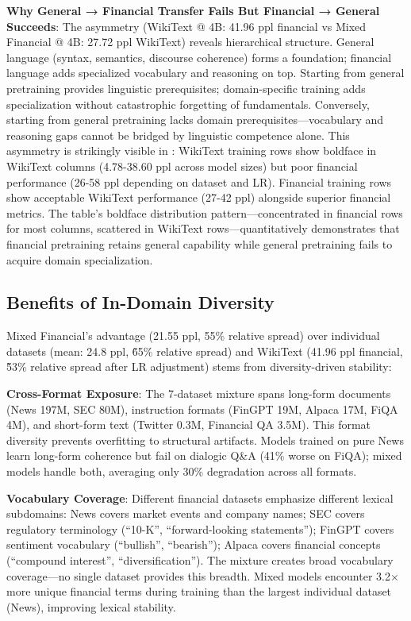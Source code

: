 \textbf{Why General → Financial Transfer Fails But Financial → General Succeeds}: The asymmetry (WikiText @ 4B: 41.96 ppl financial vs Mixed Financial @ 4B: 27.72 ppl WikiText) reveals hierarchical structure. General language (syntax, semantics, discourse coherence) forms a foundation; financial language adds specialized vocabulary and reasoning on top. Starting from general pretraining provides linguistic prerequisites; domain-specific training adds specialization without catastrophic forgetting of fundamentals. Conversely, starting from general pretraining lacks domain prerequisites—vocabulary and reasoning gaps cannot be bridged by linguistic competence alone. This asymmetry is strikingly visible in : WikiText training rows show boldface in WikiText columns (4.78-38.60 ppl across model sizes) but poor financial performance (26-58 ppl depending on dataset and LR). Financial training rows show acceptable WikiText performance (27-42 ppl) alongside superior financial metrics. The table's boldface distribution pattern—concentrated in financial rows for most columns, scattered in WikiText rows—quantitatively demonstrates that financial pretraining retains general capability while general pretraining fails to acquire domain specialization.

\subsection{Benefits of In-Domain Diversity}

Mixed Financial's advantage (21.55 ppl, 55\% relative spread) over individual datasets (mean: 24.8 ppl, \~65\% relative spread) and WikiText (41.96 ppl financial, \~53\% relative spread after LR adjustment) stems from diversity-driven stability:

\textbf{Cross-Format Exposure}: The 7-dataset mixture spans long-form documents (News 197M, SEC 80M), instruction formats (FinGPT 19M, Alpaca 17M, FiQA 4M), and short-form text (Twitter 0.3M, Financial QA 3.5M). This format diversity prevents overfitting to structural artifacts. Models trained on pure News learn long-form coherence but fail on dialogic Q\&A (41\% worse on FiQA); mixed models handle both, averaging only 30\% degradation across all formats.

\textbf{Vocabulary Coverage}: Different financial datasets emphasize different lexical subdomains: News covers market events and company names; SEC covers regulatory terminology (``10-K'', ``forward-looking statements''); FinGPT covers sentiment vocabulary (``bullish'', ``bearish''); Alpaca covers financial concepts (``compound interest'', ``diversification''). The mixture creates broad vocabulary coverage—no single dataset provides this breadth. Mixed models encounter 3.2$\times$ more unique financial terms during training than the largest individual dataset (News), improving lexical stability.

